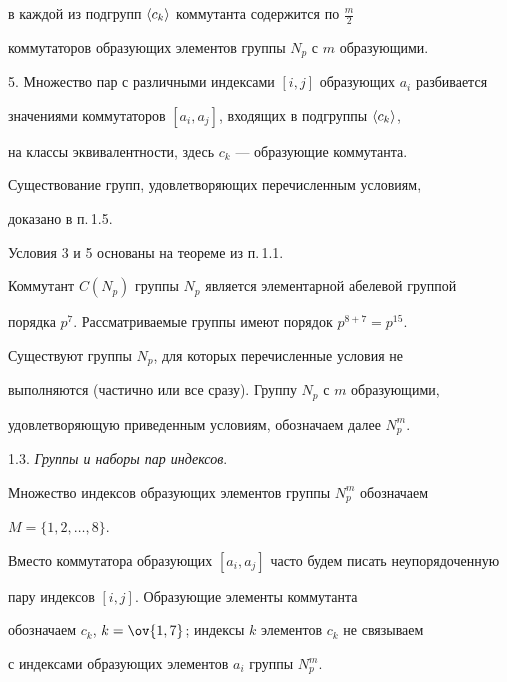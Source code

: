 в каждой из подгрупп $\langle c_k\rangle$ коммутанта содержится по $\frac{m}{2}$


коммутаторов образующих элементов группы $N_p$ с $m$ образующими.





5. Множество пар с различными индексами $[i,j]$ образующих $a_i$ разбивается 


значениями коммутаторов $[a_i,a_j]$, входящих в подгруппы $\langle c_k\rangle$,


на классы эквивалентности, здесь $c_k$ --- образующие коммутанта.





Существование групп, удовлетворяющих перечисленным условиям, 


доказано в п.\,1.5.





\noindent{}Условия 3 и 5 основаны на теореме из п.\,1.1.





Коммутант $C(N_p)$ группы $N_p$ является элементарной абелевой группой 


порядка $p^7$. Рассматриваемые группы имеют порядок $p^{8+7}=p^{15}$.





Существуют группы $N_p$, для которых перечисленные условия не


выполняются (частично или все сразу). Группу $N_p$ с $m$ образующими,


удовлетворяющую приведенным условиям, обозначаем далее $N^m_p$.


\medskip





1.3. {\it Группы и наборы пар индексов}.


Множество индексов образующих элементов группы $N^m_p$ обозначаем


$M=\{1,2,\dotsc,8\}$.


Вместо коммутатора образующих $[a_i,a_j]$ часто будем писать неупорядоченную 


пару индексов $[i,j]$. Образующие элементы коммутанта


обозначаем $c_k$, $k=\ov{1,7}$; индексы $k$ элементов $c_k$ не связываем


с индексами образующих элементов $a_i$ группы $N^m_p$.





